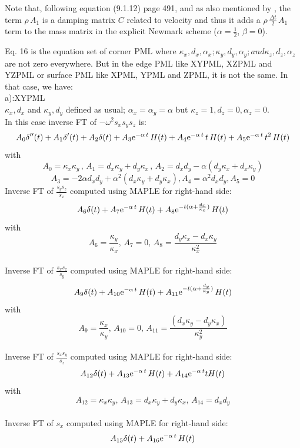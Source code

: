 \documentclass[onecolumn,extra]{gji_modified_cours_UPPA}
\renewcommand{\cite}[1]{\citet{#1}}
\begin{document}
Note that, following \cite{Hug87} equation (9.1.12) page 491, and as also mentioned by \cite{Mat11}, the term $\rho \, A_1$ is a damping
matrix $C$ related to velocity and thus it adds a $\rho \, \frac{\Delta t}{2} \, A_1$ term to the mass matrix in the
explicit Newmark scheme ($\alpha = \frac{1}{2}$, $\beta = 0$).

Eq. 16 is the equation set of corner PML where $\kappa_x,d_x,\alpha_x;\kappa_y,d_y,\alpha_y; and \kappa_z,d_z,\alpha_z$ are not zero everywhere. But in the edge PML
like XYPML, XZPML and YZPML or surface PML like XPML, YPML and ZPML, it is not the same. In that case, we have:\\
a):XYPML\\
$\kappa_x,d_x$ and $\kappa_y,d_y$ defined as usual; $\alpha_x=\alpha_y=\alpha$ but $\kappa_z = 1 ,d_z= 0,\alpha_z= 0$.\\
In this case inverse FT of $-\omega^2 s_x s_y s_z$ is:
$$A_0 \delta''(t) + A_1 \delta'(t) + A_2 \delta(t)
+ A_3 {\rm e}^{-\alpha\,t} \, H(t)
+ A_4 {\rm e}^{-\alpha\,t} \,t\, H(t)
+ A_5 {\rm e}^{-\alpha\,t} \,t^{2} \,H(t)$$
with
$$A_0 = \kappa_x \kappa_y \, , \, A_1 =d_x \kappa_y + d_y \kappa_x \, , \,A_2 = d_x d_y -\alpha(d_y \kappa_x + d_x \kappa_y)$$
$$A_3= - 2 \alpha d_x d_y +\alpha ^2 (d_x \kappa_y +  d_y \kappa_x),A_4= \alpha ^2 d_x d_y, A_5=0 $$
\noindent
Inverse FT of $\frac{s_y s_z}{s_x}$ computed using MAPLE for right-hand side:\\
$$A_6\delta(t) + A_7 {\rm e}^{-\alpha\,t} \, H(t) + A_8 {\rm e}^{-t(\alpha+\frac{d_x}{\kappa_x})} \, H(t) $$
with
$$A_6=\frac{\kappa_y}{\kappa_x},\,A_7=0,\,A_8=\frac{d_y \kappa_x-d_x \kappa_y }{\kappa^2_x} $$\\
\noindent
Inverse FT of $\frac{s_x s_z}{s_y}$ computed using MAPLE for right-hand side:\\
$$A_9\delta(t) + A_{10} {\rm e}^{-\alpha\,t} \, H(t) + A_{11} {\rm e}^{-t(\alpha+\frac{d_y}{\kappa_y})} \, H(t) $$
with
$$A_9=\frac{\kappa_x}{\kappa_y},\,A_{10}=0,
\,A_{11}=\frac{(d_x \kappa_y - d_y \kappa_x )}{\kappa^{2}_y}$$\\
\noindent
Inverse FT of $\frac{s_x s_y}{s_z}$ computed using MAPLE for right-hand side:\\
$$ A_{12}\delta(t) + A_{13} {\rm e}^{-\alpha\,t} \, H(t) + A_{14} {\rm e}^{-\alpha \,t} t H(t) $$
with
$$A_{12}=\kappa_x \kappa_y,\,A_{13}=d_x\kappa_y+d_y\kappa_x,
\,A_{14}=d_xd_y$$\\
\noindent
Inverse FT of $s_x$ computed using MAPLE for right-hand side:
$$A_{15}\delta(t) + A_{16} {\rm e}^{-\alpha \,t} \, H(t) $$
\end{document}
